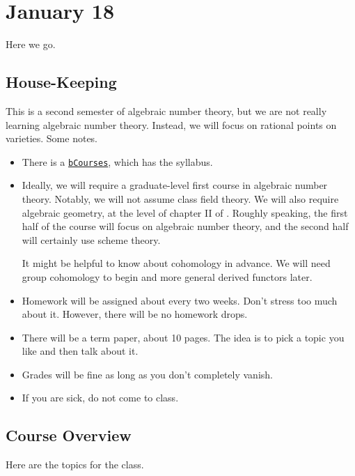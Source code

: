 \documentclass[../notes.tex]{subfiles}
\begin{document}
\section{January 18}

Here we go.

\subsection{House-Keeping}
This is a second semester of algebraic number theory, but we are not really learning algebraic number theory. Instead, we will focus on rational points on varieties. Some notes.
\begin{itemize}
	\item There is a \href{https://bcourses.berkeley.edu/courses/1521007}{\texttt{bCourses}}, which has the syllabus.
	\item Ideally, we will require a graduate-level first course in algebraic number theory. Notably, we will not assume class field theory. We will also require algebraic geometry, at the level of chapter II of \cite{hartshorne}. Roughly speaking, the first half of the course will focus on algebraic number theory, and the second half will certainly use scheme theory.

	It might be helpful to know about cohomology in advance. We will need group cohomology to begin and more general derived functors later.
	\item Homework will be assigned about every two weeks. Don't stress too much about it. However, there will be no homework drops.
	\item There will be a term paper, about 10 pages. The idea is to pick a topic you like and then talk about it.
	\item Grades will be fine as long as you don't completely vanish.
	\item If you are sick, do not come to class.
\end{itemize}

\subsection{Course Overview}
Here are the topics for the class.
\end{document}
